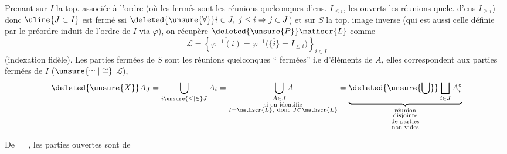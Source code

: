 Prenant sur $I$ la top. associée à l'ordre (où les fermés sont les réunions quel\uline{conques} d'ens. $I_{\leq i}$, les ouverts les réunions quelc. d'ens $I_{\geq i}$) -- donc $\uline{\ensuremath{J\subset I}}$ est fermé ssi $\deleted{\unsure{\forall}}i\in J,\ j\leq i\Rightarrow j\in J$) et sur $S$ la top. image inverse (qui est aussi celle définie par le préordre induit de l'ordre de $I$ via $\varphi$),  on récupère $\deleted{\unsure{P}}\mathscr{L}$ comme
\[
 \mathscr{L}=\left\{\overline{\varphi^{-1}(i)}=\varphi^{-1}
 \bigl(\overline{\{i\}}=I_{\leq i}\bigr)\right\}_{i\in I}
\]
(indexation fidèle). Les parties fermées de $S$ sont les réunions quelconques  `` fermées'' i.e d'éléments de $A$, elles correspondent  aux parties fermées  de $I$ ($\unsure{\simeq|\cong}$  $\mathscr{L}$),  
\[
\deleted{\unsure{X}}A_J=\bigcup_{i\unsure{\leq|\in}J}A_i
 =\underset{\substack{\text{si on identifie}\\I=\mathscr{L},\ \text{donc }J\subset\mathscr{L}}}{\bigcup_{A\in J} A}
 =\underbrace{\deleted{\unsure{\bigcup}}\bigsqcup_{i\in J}A_i^\circ}_{\substack{\text{réunion}\\\text{disjointe}\\\text{de parties}\\\text{non vides}}}
\]
 

De $=$, les parties ouvertes sont  de
